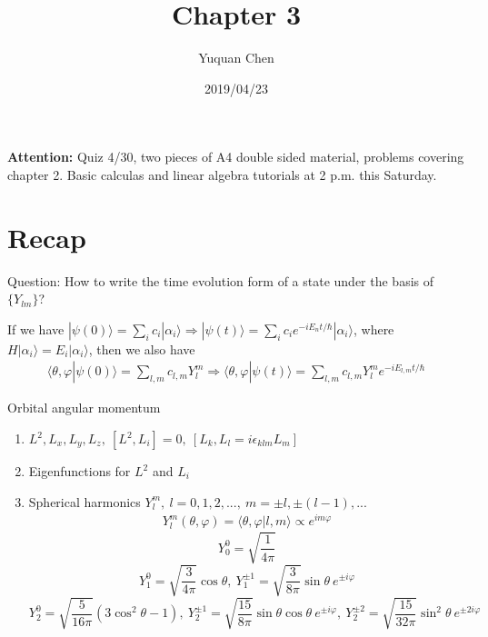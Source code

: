 \documentclass[UTF8,12pt]{article} %
\begin{document}
\title{Chapter 3}
\author{Yuquan Chen}
\date{2019/04/23} %
\maketitle

\textbf{Attention:} Quiz 4/30, two pieces of A4 double sided material, problems covering chapter 2. Basic calculas and linear algebra tutorials at 2 p.m. this Saturday.\\

\section{Recap}

Question: How to write the time evolution form of a state under the basis of $\{Y_{lm}\}$?\par
If we have $|\psi(0)\rangle = \sum_i c_i|\alpha_i\rangle \Rightarrow |\psi(t)\rangle = \sum_i c_i e^{-iE_n t/\hbar}|\alpha_i\rangle$,  where $H|\alpha_i\rangle = E_{i}|\alpha_{i}\rangle$, then we also have
\begin{align}
\langle\theta,\varphi|\psi(0)\rangle = \sum_{l,m}c_{l,m}Y_{l}^{m}\Rightarrow \langle\theta,\varphi|\psi(t)\rangle = \sum_{l,m}c_{l,m}Y_{l}^{m}e^{-iE_{l,m}t/\hbar}
\end{align}

\begin{myboxes}{Orbital angular momentum}{}
\begin{enumerate}
\item $L^{2}, L_{x}, L_{y}, L_{z},~[L^{2},L_{i}] = 0,~[L_{k},L_{l} = i\epsilon_{klm} L_{m}]$
\item Eigenfunctions for $L^{2}$ and $L_{i}$
\item Spherical harmonics $Y_{l}^{m},~ l = 0,1,2,...,~ m = \pm l,\pm (l-1),...$
\begin{align}
Y_{l}^{m}(\theta,\varphi) = \langle\theta,\varphi|l,m\rangle\propto e^{im\varphi}
\end{align}
$$Y_{0}^{0} = \sqrt{\frac{1}{4\pi}}$$
$$Y_{1}^{0} = \sqrt{\frac{3}{4\pi}}\cos\theta,~ Y_{1}^{\pm 1} = \sqrt{\frac{3}{8\pi}}\sin\theta ~e^{\pm i\varphi}$$
$$Y_{2}^{0} = \sqrt{\frac{5}{16\pi}}(3\cos^{2}\theta-1),~Y_{2}^{\pm1} = \sqrt{\frac{15}{8\pi}}\sin\theta\cos\theta~e^{\pm i\varphi},~Y_{2}^{\pm2} = \sqrt{\frac{15}{32\pi}}\sin^{2}\theta~e^{\pm2i\varphi}$$
\end{enumerate}
\end{myboxes}~\\
\end{document}
